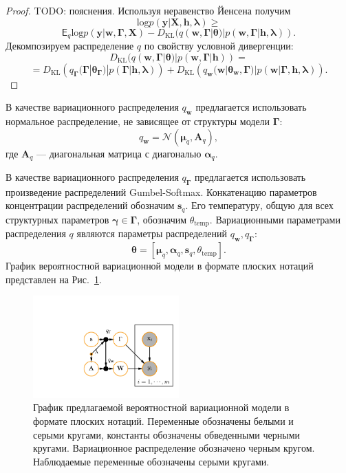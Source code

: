 \begin{proof}
TODO: пояснения.
Используя неравенство Йенсена получим 
\[
\text{log} p(\mathbf{y}|\mathbf{X}, \mathbf{h}, \boldsymbol{\lambda}) \geq
\]
\[
   \mathsf{E}_{q} \text{log}p(\mathbf{y}|\mathbf{w}, \boldsymbol{\Gamma}, \mathbf{X})-D_\text{KL}(q (\mathbf{w},\boldsymbol{\Gamma}|\boldsymbol{\theta})|p(\mathbf{w},\boldsymbol{\Gamma}|\mathbf{h}, \boldsymbol{\lambda})).
\]
Декомпозируем распределение $q$ по свойству условной дивергенции:
\[
D_\text{KL}(q (\mathbf{w},\boldsymbol{\Gamma}|\boldsymbol{\theta})|p(\mathbf{w},\boldsymbol{\Gamma}|\mathbf{h})) = 
\]
\[
=D_\text{KL}\left(q_{\boldsymbol{\Gamma}}(\boldsymbol{\Gamma}|\boldsymbol{\theta}_{\boldsymbol{\Gamma}})|p(\boldsymbol{\Gamma}|\mathbf{h}, \boldsymbol{\lambda})\right)+D_\text{KL}\left(q_{\mathbf{w}}(\mathbf{w}|\boldsymbol{\theta}_\mathbf{w},\boldsymbol{\Gamma})|p(\mathbf{w}|\boldsymbol{\Gamma}, \mathbf{h}, \boldsymbol{\lambda})\right).    
\]
\end{proof}
В качестве вариационного распределения $q_{\mathbf{w}}$ предлагается использовать нормальное распределение, не зависящее от структуры модели $\boldsymbol{\Gamma}$:
\[
    q_{\mathbf{w}} = \mathcal{N}(\boldsymbol{\mu}_q, \mathbf{A}_q), 
\]
где $\mathbf{A}_q$ --- диагональная матрица с диагональю $\boldsymbol{\alpha}_q$.

В качестве вариационного распределения $q_{\boldsymbol{\Gamma}}$ предлагается использовать произведение распределений Gumbel-Softmax. Конкатенацию параметров концентрации распределений обозначим $\mathbf{s}_q$. Его температуру, общую для всех структурных параметров $\boldsymbol{\gamma} \in \boldsymbol{\Gamma}$, обозначим $\theta_\text{temp}$.
Вариационными параметрами распределения $q$ являются параметры распределений $q_{\mathbf{w}}, q_{\boldsymbol{\Gamma}}$:
\[\boldsymbol{\theta}=[\boldsymbol{\mu}_q, \boldsymbol{\alpha}_q,\mathbf{s}_q, \theta_\text{temp}]. 
\]
График вероятностной вариационной модели в формате плоских нотаций представлен на Рис.~\ref{fig:plate_qprob}.
\begin{figure}
\centering
   \includegraphics[width=0.5\textwidth]{plots/notebooks/plate.pdf}
\caption{График предлагаемой вероятностной вариационной модели в формате плоских нотаций. Переменные обозначены белыми и серыми кругами, константы обозначены обведенными черными кругами. Вариационное распределение обозначено черным кругом. Наблюдаемые переменные обозначены серыми кругами.}
\label{fig:plate_qprob}
\end{figure}

